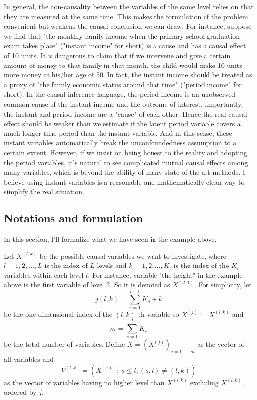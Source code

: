 \documentclass[11pt]{article}
\newcommand{\pth}[1]{\left( #1 \right)}
\begin{document}
In general, the non-causality between the variables of the same level relies on that they are measured at the same time. This makes the formulation of the problem convenient but weakens the causal conclusion we can draw. For instance, suppose we find that "the monthly family income when the primary school graduation exam takes place" ("instant income" for short) is a cause and has a causal effect of 10 units. It is dangerous to claim that if we intervene and give a certain amount of money to that family in that month, the child would make 10 units more money at his/her age of 50. In fact, the instant income should be treated as a proxy of "the family economic status around that time" ("period income" for short). In the causal inference language, the period income is an unobserved common cause of the instant income and the outcome of interest. Importantly, the instant and period income are a "cause" of each other. Hence the real causal effect should be weaker than we estimate if the latent period variable covers a much longer time period than the instant variable. And in this sense, these instant variables automatically break the unconfoundedness assumption to a certain extent. However, if we insist on being honest to the reality and adopting the period variables, it's natural to see complicated mutual causal effects among many variables, which is beyond the ability of many state-of-the-art methods. I believe using instant variables is a reasonable and mathematically clean way to simplify the real situation.

\subsection{Notations and formulation}%

In this section, I'll formalize what we have seen in the example above.

Let $X^{(l,k)}$ be the possible causal variables we want to investigate, where $l = 1, 2, \ldots, L$ is the index of $L$ levels and $k = 1, 2, \ldots, K_l$ is the index of the $K_l$ variables within each level $l$. For instance, variable "the height" in the example above is the first variable of level 2. So it is denoted as $X^{(2,1)}$. For simplicity, let
\[ j(l,k) = \sum_{s=1}^{l-1} K_s + k \]
be the one dimensional index of the $(l,k)$-th variable so $ X^{(j)} := X^{(l,k)}$ and
\[ m = \sum_{s=1}^l K_s \]
be the total number of variables. Define $X = \pth{X^{(j)}}_{j = 1, \ldots, m}$ as the vector of all variables and
\[V^{(l,k)} = \pth{X^{(s,t)}: \; s \leq l, (s, t) \neq (l, k)}\]
as the vector of variables having no higher level than $X^{(l, k)}$ excluding $X^{(l, k)}$, ordered by $j$.
\end{document}
